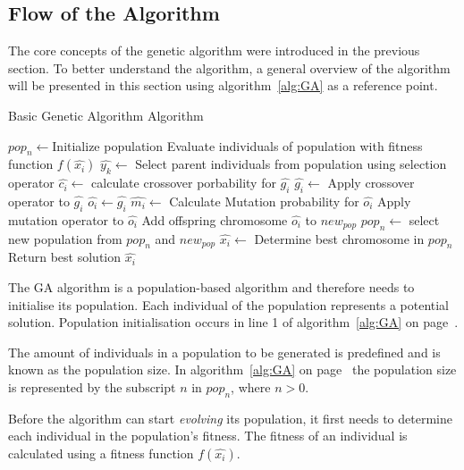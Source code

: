 \subsection{Flow of the Algorithm}
The core concepts of the genetic algorithm were introduced in the previous section. To better understand the algorithm, a general overview of the algorithm will be presented in this section using algorithm~\ref{alg:GA} as a reference point.
\begin{algorithm}[H]
\caption{Basic Genetic Algorithm Algorithm\cite{FamilyGA,AdaptiveSAGA,DistributedHierarchicalGA,SelfAdaptiveGA}}
\label{alg:GA}
	\begin{algorithmic}[1]
		\State $pop_n\leftarrow$Initialize population
    \State Evaluate individuals of population with fitness function $f(\hat{x_i})$
    \State $\hat{y_k} \leftarrow$ Select parent individuals from population using selection operator
		\Repeat
    \State $\hat{c_i} \leftarrow$ calculate crossover porbability for $\hat{g_i}$
    \State $\hat{g_i} \leftarrow$ Apply crossover operator to $\hat{g_i}$
				\EndIf
        \State $\hat{o_i} \leftarrow \hat{g_i}$
        \State $\hat{m_i}\leftarrow$ Calculate Mutation probability for $\hat{o_i}$
        \State Apply mutation operator to $\hat{o_i}$
				\EndIf
        \State Add offspring chromosome $\hat{o_i}$ to $new_{pop}$
			\EndFor
		\State $pop_n \leftarrow$ select new population from $pop_n$ and $new_{pop}$
		\EndWhile
    \State $\hat{x_i} \leftarrow$ Determine best chromosome in $pop_n$
    \State Return best solution $\hat{x_i}$
	\end{algorithmic}
\end{algorithm}
The \gls{GA} algorithm is a population-based algorithm and therefore needs to initialise its population. Each individual of the population represents a potential solution. Population initialisation occurs in line 1 of algorithm~\ref{alg:GA} on page~\pageref{alg:GA}. 

The amount of individuals in a population to be generated is predefined and is known as the population size. In algorithm~\ref{alg:GA} on page~\pageref{alg:GA} the population size is represented by the subscript $n$ in $pop_n$, where $n > 0$.

Before the algorithm can start \emph{evolving} its population, it first needs to determine each individual in the population's fitness. The fitness of an individual is calculated using a fitness function $f(\hat{x_i})$.

